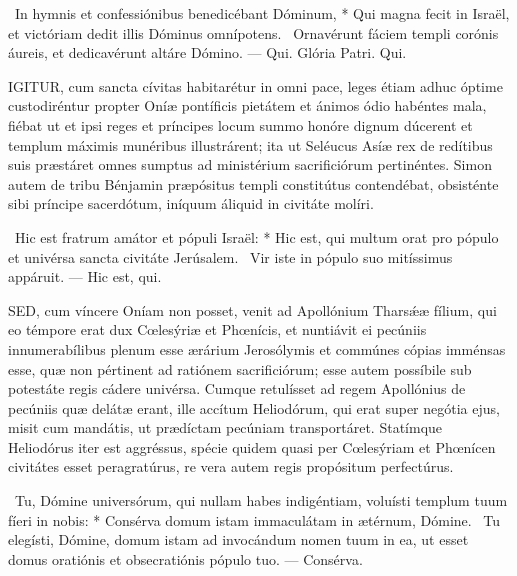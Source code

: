 \R\ In hymnis et confessiónibus benedicébant Dóminum, * Qui magna fecit in Israël, et victóriam dedit illis Dóminus omnípotens. \V\ Ornavérunt fáciem templi corónis áureis, et dedicavérunt altáre Dómino. — Qui. Glória Patri. Qui.




\lettrine[lines=2]{I}{GITUR}, cum sancta cívitas habitarétur in omni pace, leges étiam adhuc óptime custodiréntur propter Oníæ pontíficis pietátem et ánimos ódio habéntes mala, fiébat ut et ipsi reges et príncipes locum summo honóre dignum dúcerent et templum máximis munéribus illustrárent; ita ut Seléucus Asíæ rex de redítibus suis præstáret omnes sumptus ad ministérium sacrificiórum pertinéntes. Simon autem de tribu Bénjamin præpósitus templi constitútus contendébat, obsisténte sibi príncipe sacerdótum, iníquum áliquid in civitáte molíri.

\R\ Hic est fratrum amátor et pópuli Israël: * Hic est, qui multum orat pro pópulo et univérsa sancta civitáte Jerúsalem. \V\ Vir iste in pópulo suo mitíssimus appáruit. — Hic est, qui.


\lettrine[lines=2]{S}{ED}, cum víncere Oníam non posset, venit ad Apollónium Tharsǽæ fílium, qui eo témpore erat dux Cœlesýriæ et Phœnícis, et nuntiávit ei pecúniis innumerabílibus plenum esse ærárium Jerosólymis et commúnes cópias imménsas esse, quæ non pértinent ad ratiónem sacrificiórum; esse autem possíbile sub potestáte regis cádere univérsa. Cumque retulísset ad regem Apollónius de pecúniis quæ delátæ erant, ille accítum Heliodórum, qui erat super negótia ejus, misit cum mandátis, ut prædíctam pecúniam transportáret. Statímque Heliodórus iter est aggréssus, spécie quidem quasi per Cœlesýriam et Phœnícen civitátes esset peragratúrus, re vera autem regis propósitum perfectúrus.

\R\ Tu, Dómine universórum, qui nullam habes indigéntiam, voluísti templum tuum fíeri in nobis: * Consérva domum istam immaculátam in ætérnum, Dómine. \V\ Tu elegísti, Dómine, domum istam ad invocándum nomen tuum in ea, ut esset domus oratiónis et obsecratiónis pópulo tuo. — Consérva.



